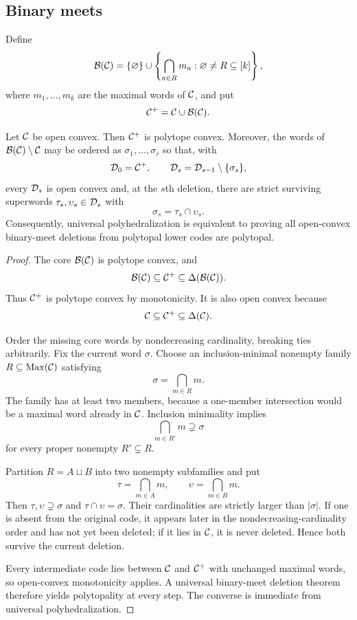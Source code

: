 \subsection{Binary meets}

Define
\[
 \mathcal B(\mathcal C)=\{\varnothing\}\cup
 \left\{\bigcap_{a\in R}m_a:
 \varnothing\ne R\subseteq[k]\right\},
\]
where $m_1,\ldots,m_k$ are the maximal words of $\mathcal C$, and put
\[
 \mathcal C^+=\mathcal C\cup\mathcal B(\mathcal C).
\]

\begin{theorem}
\label{thm:binary-meet-reduction}
Let $\mathcal C$ be open convex.  Then $\mathcal C^+$ is polytope convex.  Moreover, the words of $\mathcal B(\mathcal C)\setminus\mathcal C$ may be ordered as $\sigma_1,\ldots,\sigma_r$ so that, with
\[
 \mathcal D_0=\mathcal C^+,
 \qquad
 \mathcal D_s=\mathcal D_{s-1}\setminus\{\sigma_s\},
\]
every $\mathcal D_s$ is open convex and, at the $s$th deletion, there are strict surviving superwords $\tau_s,\upsilon_s\in\mathcal D_s$ with
\[
 \sigma_s=\tau_s\cap\upsilon_s.
\]
Consequently, universal polyhedralization is equivalent to proving all open-convex binary-meet deletions from polytopal lower codes are polytopal.
\end{theorem}

\begin{proof}
The core $\mathcal B(\mathcal C)$ is polytope convex, and
\[
 \mathcal B(\mathcal C)\subseteq\mathcal C^+\subseteq\Delta(\mathcal B(\mathcal C)).
\]
Thus $\mathcal C^+$ is polytope convex by monotonicity.  It is also open convex because
\[
 \mathcal C\subseteq\mathcal C^+\subseteq\Delta(\mathcal C).
\]

Order the missing core words by nondecreasing cardinality, breaking ties arbitrarily.  Fix the current word $\sigma$.  Choose an inclusion-minimal nonempty family $R\subseteq\operatorname{Max}(\mathcal C)$ satisfying
\[
 \sigma=\bigcap_{m\in R}m.
\]
The family has at least two members, because a one-member intersection would be a maximal word already in $\mathcal C$.  Inclusion minimality implies
\[
 \bigcap_{m\in R'}m\supsetneq\sigma
\]
for every proper nonempty $R'\subsetneq R$.

Partition $R=A\sqcup B$ into two nonempty subfamilies and put
\[
 \tau=\bigcap_{m\in A}m,
 \qquad
 \upsilon=\bigcap_{m\in B}m.
\]
Then $\tau,\upsilon\supsetneq\sigma$ and $\tau\cap\upsilon=\sigma$.  Their cardinalities are strictly larger than $|\sigma|$.  If one is absent from the original code, it appears later in the nondecreasing-cardinality order and has not yet been deleted; if it lies in $\mathcal C$, it is never deleted.  Hence both survive the current deletion.

Every intermediate code lies between $\mathcal C$ and $\mathcal C^+$ with unchanged maximal words, so open-convex monotonicity applies.  A universal binary-meet deletion theorem therefore yields polytopality at every step.  The converse is immediate from universal polyhedralization.
\end{proof}

